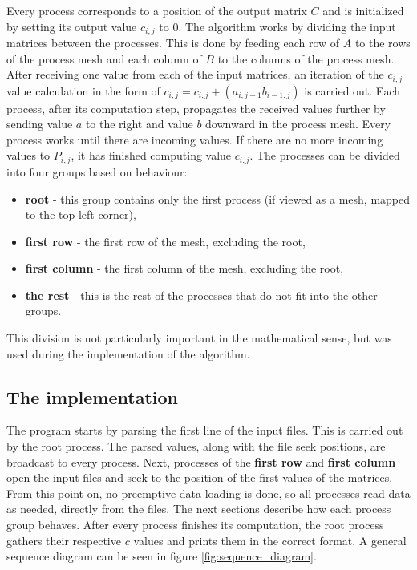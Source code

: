 \documentclass[pdftex, 11pt, a4paper, titlepage]{article}
\begin{document}
    Every process corresponds to a position of the output matrix $C$ and is initialized
    by setting its output value $c_{i,j}$ to $0$.
    The algorithm works by dividing the input matrices between the processes. This is
    done by feeding each row of $A$ to the rows of the process mesh and
    each column of $B$ to the columns of the process mesh. After receiving one value
    from each of the input matrices, an iteration of the $c_{i,j}$ value calculation
    in the form of $c_{i,j} = c_{i,j} + (a_{i,j-1} b_{i-1,j})$ is carried out.
    Each process, after its computation step, propagates the received values further
    by sending value $a$ to the right and value $b$ downward in the process mesh.
    Every process works until there are incoming values. If there are no more incoming
    values to $P_{i,j}$, it has finished computing value $c_{i,j}$.
    The processes can be divided into four groups based on behaviour:
    \begin{itemize}
        \item \textbf{root} - this group contains only the first process (if viewed as a mesh,
                mapped to the top left corner),
        \item \textbf{first row} - the first row of the mesh, excluding the root,
        \item \textbf{first column} - the first column of the mesh, excluding the root,
        \item \textbf{the rest} - this is the rest of the processes that do not fit into the
                other groups.
    \end{itemize}
    This division is not particularly important in the mathematical sense, but was
    used during the implementation of the algorithm.

    \subsection{The implementation}
    The program starts by parsing the first line of the input files. This is carried out
    by the root process. The parsed values, along with the file seek positions, are broadcast
    to every process. Next, processes of the \textbf{first row} and \textbf{first column}
    open the input files and seek to the position of the first values of the matrices.
    From this point on, no preemptive data loading is done, so all processes read data
    as needed, directly from the files. The next sections describe how each process
    group behaves. After every process finishes its computation, the root process
    gathers their respective $c$ values and prints them in the correct format.
    A general sequence diagram can be seen in figure \ref{fig:sequence_diagram}.
\end{document}
